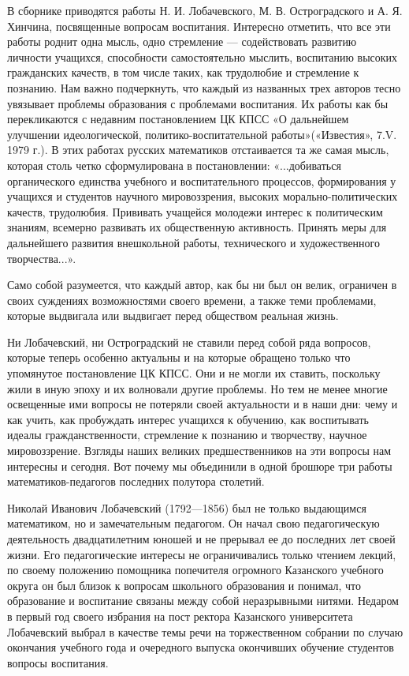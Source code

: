 \documentclass[12pt, a4paper, openany]{book}
\begin{document}
В сборнике приводятся работы Н. И. Лобачевского, М. В. Остроградского и А. Я. Хинчина, посвященные  вопросам воспитания. Интересно отметить, что все эти работы роднит одна мысль, одно стремление — содействовать  развитию личности учащихся, способности самостоятельно мыслить, воспитанию высоких гражданских качеств, в том числе таких, как трудолюбие и стремление к познанию. Нам важно подчеркнуть, что каждый из названных трех авторов тесно увязывает проблемы образования с  проблемами воспитания. Их работы как бы перекликаются с  недавним постановлением ЦК КПСС «О дальнейшем  улучшении идеологической, политико-воспитательной работы»(«Известия», 7.V. 1979 г.). В этих работах русских математиков отстаивается та же самая мысль, которая столь четко  сформулирована в постановлении: «...добиваться органического единства учебного и воспитательного процессов,  формирования у учащихся и студентов научного мировоззрения, высоких морально-политических качеств, трудолюбия.  Прививать учащейся молодежи интерес к политическим  знаниям, всемерно развивать их общественную активность. Принять меры для дальнейшего развития внешкольной работы, технического и художественного творчества...». 

Само собой разумеется, что каждый автор, как бы ни был он велик, ограничен в своих суждениях  возможностями своего времени, а также теми проблемами, которые  выдвигала или выдвигает перед обществом реальная жизнь.

Ни Лобачевский, ни Остроградский не ставили перед собой ряда вопросов, которые теперь особенно актуальны и на которые обращено только что упомянутое  постановление ЦК КПСС. Они и не могли их ставить, поскольку жили в иную эпоху и их волновали другие проблемы. Но тем не менее многие освещенные ими вопросы не потеряли своей актуальности и в наши дни: чему и как учить, как  пробуждать интерес учащихся к обучению, как воспитывать  идеалы гражданственности, стремление к познанию и  творчеству, научное мировоззрение. Взгляды наших великих предшественников на эти вопросы нам интересны и сегодня. Вот почему мы объединили в одной брошюре три работы математиков-педагогов последних полутора столетий. 

Николай Иванович Лобачевский (1792—1856) был не только выдающимся математиком, но и замечательным  педагогом. Он начал свою педагогическую деятельность  двадцатилетним юношей и не прерывал ее до последних лет своей жизни. Его педагогические интересы не  ограничивались только чтением лекций, по своему положению  помощника попечителя огромного Казанского учебного округа он был близок к вопросам школьного образования и понимал, что образование и воспитание связаны между собой  неразрывными нитями. Недаром в первый год своего избрания на пост ректора Казанского университета Лобачевский  выбрал в качестве темы речи на торжественном собрании по случаю окончания учебного года и очередного выпуска окончивших обучение студентов вопросы воспитания. 
\end{document}
